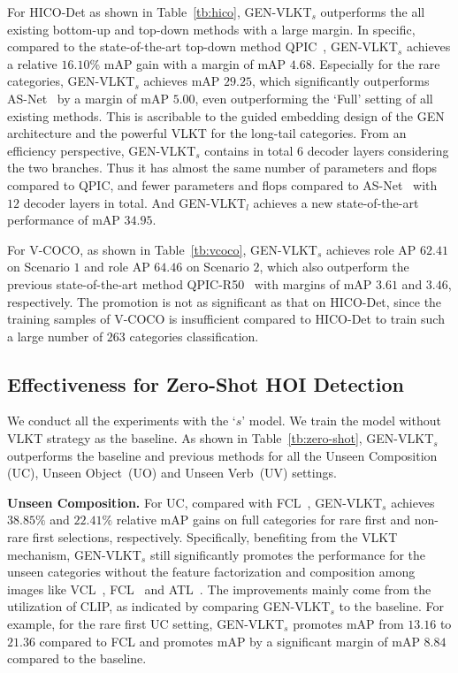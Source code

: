 \documentclass[10pt,twocolumn,letterpaper]{article}
\begin{document}
For HICO-Det as shown in Table~\ref{tb:hico}, GEN-VLKT$_s$ outperforms the all existing bottom-up and top-down methods with a large margin. In specific, compared to the state-of-the-art top-down method QPIC~\cite{tamura2021qpic}, GEN-VLKT$_s$ achieves a relative  $16.10\%$ mAP gain with a margin of mAP $4.68$. Especially for the rare categories, GEN-VLKT$_s$ achieves mAP $29.25$, which significantly outperforms AS-Net~\cite{chen_2021_asnet} by a margin of mAP $5.00$, even outperforming the `Full' setting of all existing methods. This is ascribable to the guided embedding design of the GEN architecture and the powerful VLKT for the long-tail categories. From an efficiency perspective, GEN-VLKT$_s$ contains in total $6$ decoder layers considering the two branches. Thus it has almost the same number of parameters and flops compared to QPIC, and fewer parameters and flops compared to AS-Net~\cite{chen_2021_asnet} with $12$ decoder layers in total. And GEN-VLKT$_l$ achieves a new state-of-the-art performance of mAP $34.95$.

For V-COCO, as shown in Table~\ref{tb:vcoco}, GEN-VLKT$_s$ achieves role AP $62.41$ on Scenario $1$ and role AP $64.46$ on Scenario $2$, which also outperform the previous state-of-the-art method QPIC-R50~\cite{tamura2021qpic} with margins of mAP $3.61$ and $3.46$, respectively. 
The promotion is not as significant as that on HICO-Det, since the training samples of V-COCO is insufficient compared to HICO-Det to train such a large number of $263$ categories classification.


\vspace{-1.5mm}\subsection{Effectiveness for Zero-Shot HOI Detection}\label{sec:zero-shot}\vspace{-1.5mm}

We conduct all the experiments with the `$s$' model. We train the model without VLKT strategy as the baseline. As shown in Table~\ref{tb:zero-shot}, GEN-VLKT$_s$ outperforms the baseline and previous methods for all the Unseen Composition (UC), Unseen Object~(UO) and Unseen Verb~(UV) settings. 

\vspace{1mm}\noindent\textbf{Unseen Composition.} For UC, compared with FCL~\cite{hou2021detecting}, GEN-VLKT$_s$ achieves $38.85\%$ and $22.41\%$ relative mAP gains on full categories for rare first and non-rare first selections, respectively. Specifically, benefiting from the VLKT mechanism, GEN-VLKT$_s$ still significantly promotes the performance for the unseen categories without the feature factorization and composition among images like VCL~\cite{hou2020visual}, FCL~\cite{hou2021detecting} and ATL~\cite{hou2021affordance}. The improvements mainly come from the utilization of CLIP, as indicated by comparing GEN-VLKT$_s$ to the baseline. For example, for the rare first UC setting, GEN-VLKT$_s$ promotes mAP from $13.16$ to $21.36$ compared to FCL and promotes mAP by a significant margin of mAP $8.84$ compared to the baseline. 
\end{document}
